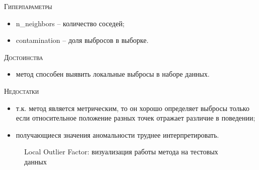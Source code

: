 \documentclass[12pt]{article}
\begin{document}
    \noindent \textsc{Гиперпараметры}
    \begin{itemize}
        \item n\_neighbors -- количество соседей;
        \item contamination – доля выбросов в выборке.
    \end{itemize}

    \noindent \textsc{Достоинства}
    \begin{itemize}
        \item метод способен выявить локальные выбросы в наборе данных.
    \end{itemize}

    \noindent \textsc{Недостатки}
    \begin{itemize}
        \item т.к. метод является метрическим, то он хорошо определяет выбросы только если относительное положение разных точек отражает различие в поведении;
        \item получающиеся значения аномальности труднее интерпретировать.
    \end{itemize}

    \begin{figure}[h!]
        \centering
        \caption{Local Outlier Factor: визуализация работы метода на тестовых данных}
        \label{sec:Research:Model:Visualization:fig:LocalOutlierFactor}
    \end{figure}
\end{document}
